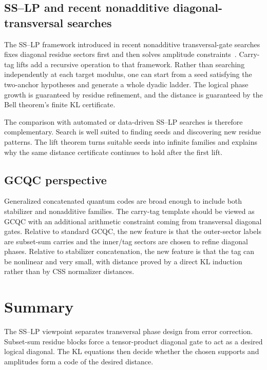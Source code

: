 \documentclass[11pt]{article}
\begin{document}
\subsection{SS--LP and recent nonadditive diagonal-transversal searches}

The SS--LP framework introduced in recent nonadditive transversal-gate searches fixes diagonal
residue sectors first and then solves amplitude constraints~\cite{ZhangWuHuangZeng2025}.  Carry-tag lifts add a recursive
operation to that framework.  Rather than searching independently at each target modulus, one can
start from a seed satisfying the two-anchor hypotheses and generate a whole dyadic ladder.  The
logical phase growth is guaranteed by residue refinement, and the distance is guaranteed by the
Bell theorem's finite KL certificate.

The comparison with automated or data-driven SS--LP searches is therefore complementary.  Search is
well suited to finding seeds and discovering new residue patterns.  The lift theorem turns suitable
seeds into infinite families and explains why the same distance certificate continues to hold after
the first lift.

\subsection{GCQC perspective}

Generalized concatenated quantum codes are broad enough to include both stabilizer and nonadditive
families.  The carry-tag template should be viewed as GCQC with an additional arithmetic constraint
coming from transversal diagonal gates.  Relative to standard GCQC, the new feature is that the
outer-sector labels are subset-sum carries and the inner/tag sectors are chosen to refine diagonal
phases.  Relative to stabilizer concatenation, the new feature is that the tag can be nonlinear and
very small, with distance proved by a direct KL induction rather than by CSS normalizer distances.

\section{Summary}
\label{sec:summary}

The SS--LP viewpoint separates transversal phase design from error correction.  Subset-sum residue
blocks force a tensor-product diagonal gate to act as a desired logical diagonal.  The KL equations
then decide whether the chosen supports and amplitudes form a code of the desired distance.
\end{document}
